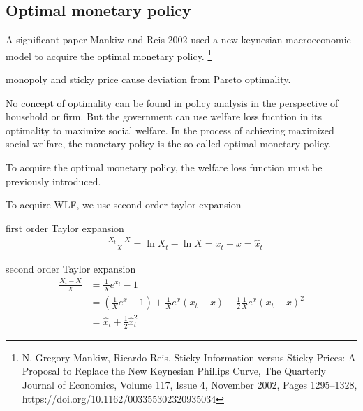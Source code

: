 \subsection{Optimal monetary policy}

A significant paper Mankiw and Reis 2002 used a new keynesian macroeconomic model to acquire the optimal monetary policy.
\footnote{N. Gregory Mankiw, Ricardo Reis, Sticky Information versus Sticky Prices: A Proposal to Replace the New Keynesian Phillips Curve, The Quarterly Journal of Economics, Volume 117, Issue 4, November 2002, Pages 1295–1328, https://doi.org/10.1162/003355302320935034}


\begin{blueblock}
\begin{note}
\end{note}
monopoly and sticky price cause deviation from Pareto optimality.
\end{blueblock}



\begin{blueblock}
\begin{note}
\end{note}
No concept of optimality can be found in policy analysis in the perspective of household or firm. But the government can use welfare loss fucntion in its optimality to maximize social welfare. In the process of achieving maximized social welfare, the monetary policy is the so-called optimal monetary policy.

\end{blueblock}

To acquire the optimal monetary policy, the welfare loss function must be previously introduced.


To acquire WLF, we use second order taylor expansion

first order Taylor expansion
\begin{align}
& \frac{X_t -X}{X}=\ln X_t -\ln X=x_t -x =\hat x_t
\end{align}

second order Taylor expansion
\begin{equation}
\begin{split}
 \frac{X_t -X}{X}&=\frac{1}{X}e^{x_t}-1
\\& = (\frac{1}{X}e^x -1)+\frac{1}{X}e^x(x_t -x)+\frac{1}{2}\frac{1}{X}e^x (x_t-x)^2
\\& = \hat x_t +\frac{1}{2}\hat x_t^2
\end{split}
\end{equation}


